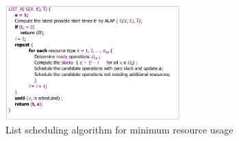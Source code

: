 \begin{figure}[H]
    \centering
    \includegraphics[width=0.6\textwidth]{./Cap4/Images/Image13.png}
    \caption{List scheduling algorithm for minimum resource usage}
    \label{fig:ListScheHUalgminRes}
\end{figure}

